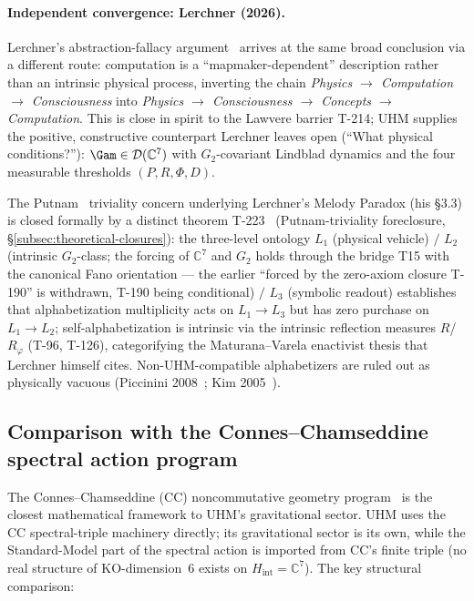 \paragraph{Independent convergence: Lerchner (2026).} Lerchner's
abstraction-fallacy argument~\cite{lerchner2026abstraction} arrives
at the same broad conclusion via a different route: computation is a
``mapmaker-dependent'' description rather than an intrinsic physical
process, inverting the chain \emph{Physics $\to$ Computation $\to$
Consciousness} into \emph{Physics $\to$ Consciousness $\to$ Concepts
$\to$ Computation}. This is close in spirit to the Lawvere barrier
T-214; UHM supplies the positive,
constructive counterpart Lerchner leaves open (``What physical
conditions?''): $\Gam \in \mathcal D(\mathbb C^7)$ with
$G_2$-covariant Lindblad dynamics and the four measurable
thresholds $(P, R, \Phi, D)$.

The Putnam~\cite{putnam1988} triviality concern underlying
Lerchner's Melody Paradox (his §3.3) is closed formally by a distinct
theorem T-223~ (Putnam-triviality foreclosure,
\S\ref{subsec:theoretical-closures}): the three-level ontology
$L_1$ (physical vehicle) $/$ $L_2$ (intrinsic $G_2$-class; the forcing
of $\mathbb C^7$ and $G_2$ holds through the bridge T15 with the canonical
Fano orientation --- the earlier ``forced by the zero-axiom closure T-190''
is withdrawn, T-190 being conditional) $/$ $L_3$ (symbolic readout)
establishes that
alphabetization multiplicity acts on $L_1 \to L_3$ but has zero
purchase on $L_1 \to L_2$; self-alphabetization is intrinsic via the
intrinsic reflection measures $R$/$R_\varphi$ (T-96, T-126), categorifying the
Maturana--Varela enactivist thesis that Lerchner himself cites.
Non-UHM-compatible alphabetizers are ruled out as physically
vacuous (Piccinini 2008~\cite{piccinini2008}; Kim
2005~\cite{kim2005}).

\subsection{Comparison with the Connes--Chamseddine spectral action program}
\label{subsec:connes-comparison}

The Connes--Chamseddine (CC) noncommutative geometry program~\cite{connes1996,chamseddine2007}
is the closest mathematical framework to UHM's gravitational sector. UHM uses the CC
spectral-triple machinery directly; its gravitational sector is its own, while
the Standard-Model part of the spectral action is imported from CC's finite
triple (no real structure of KO-dimension~6 exists on $H_{\mathrm{int}} =
\mathbb{C}^7$). The key structural comparison:

